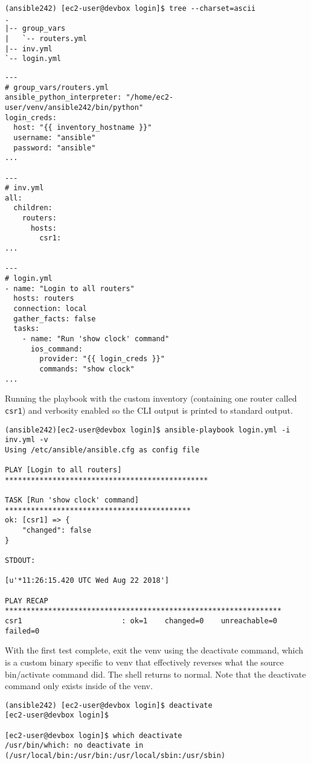 \begin{verbatim}
(ansible242) [ec2-user@devbox login]$ tree --charset=ascii
.
|-- group_vars
|   `-- routers.yml
|-- inv.yml
`-- login.yml
\end{verbatim}

\begin{verbatim}
---
# group_vars/routers.yml
ansible_python_interpreter: "/home/ec2-user/venv/ansible242/bin/python"
login_creds:
  host: "{{ inventory_hostname }}"
  username: "ansible"
  password: "ansible"
...

---
# inv.yml
all:
  children:
    routers:
      hosts:
        csr1:
...

---
# login.yml
- name: "Login to all routers"
  hosts: routers
  connection: local
  gather_facts: false
  tasks:
    - name: "Run 'show clock' command"
      ios_command:
        provider: "{{ login_creds }}"
        commands: "show clock"
...
\end{verbatim}

Running the playbook with the custom inventory (containing one router called
\verb|csr1|) and verbosity enabled so the CLI output is printed to standard
output.

\begin{verbatim}
(ansible242)[ec2-user@devbox login]$ ansible-playbook login.yml -i inv.yml -v
Using /etc/ansible/ansible.cfg as config file

PLAY [Login to all routers] ***********************************************

TASK [Run 'show clock' command] *******************************************
ok: [csr1] => {
    "changed": false
}

STDOUT:

[u'*11:26:15.420 UTC Wed Aug 22 2018']

PLAY RECAP ****************************************************************
csr1                       : ok=1    changed=0    unreachable=0    failed=0
\end{verbatim}

With the first test complete, exit the venv using the deactivate command,
which is a custom binary specific to venv that effectively reverses what the
source bin/activate command did. The shell returns to normal. Note that the
deactivate command only exists inside of the venv.

\begin{verbatim}
(ansible242) [ec2-user@devbox login]$ deactivate
[ec2-user@devbox login]$

[ec2-user@devbox login]$ which deactivate
/usr/bin/which: no deactivate in (/usr/local/bin:/usr/bin:/usr/local/sbin:/usr/sbin)
\end{verbatim}


